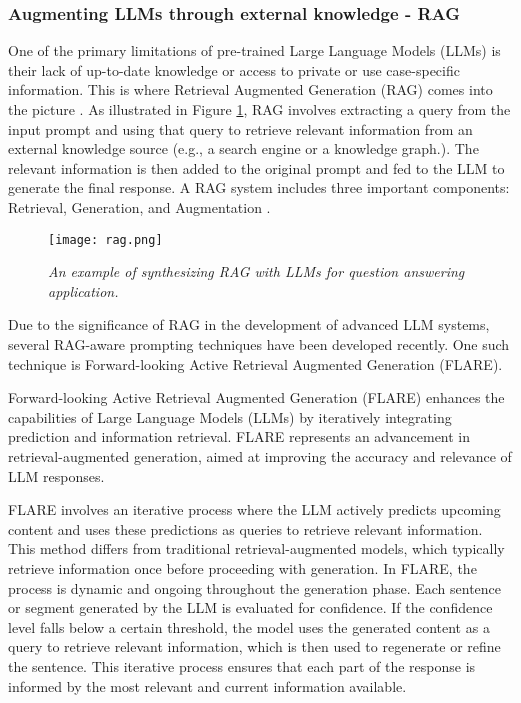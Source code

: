 \subsubsection*{Augmenting LLMs through external knowledge - RAG}

One of the primary limitations of pre-trained Large Language Models (LLMs) is their lack of up-to-date knowledge or access to private or use case-specific information. This is where Retrieval Augmented Generation (RAG) comes into the picture \cite{lewis2021retrievalaugmented}. As illustrated in Figure \ref{fig:rag1}, RAG involves extracting a query from the input prompt and using that query to retrieve relevant information from an external knowledge source (e.g., a search engine or a knowledge graph.). The relevant information is then added to the original prompt and fed to the LLM to generate the final response. A RAG system includes three important components: Retrieval, Generation, and Augmentation \cite{gao2024retrievalaugmented}.

\begin{figure}[H]
    \centering
    \texttt{[image: rag.png]}
    \caption{\it{An example of synthesizing RAG with LLMs for question answering application.}}
    \label{fig:rag1}
\end{figure}

Due to the significance of RAG in the development of advanced LLM systems, several RAG-aware prompting techniques have been developed recently. One such technique is Forward-looking Active Retrieval Augmented Generation (FLARE).

Forward-looking Active Retrieval Augmented Generation (FLARE) \cite{jiang2023active} enhances the capabilities of Large Language Models (LLMs) by iteratively integrating prediction and information retrieval. FLARE represents an advancement in retrieval-augmented generation, aimed at improving the accuracy and relevance of LLM responses.

FLARE involves an iterative process where the LLM actively predicts upcoming content and uses these predictions as queries to retrieve relevant information. This method differs from traditional retrieval-augmented models, which typically retrieve information once before proceeding with generation. In FLARE, the process is dynamic and ongoing throughout the generation phase. Each sentence or segment generated by the LLM is evaluated for confidence. If the confidence level falls below a certain threshold, the model uses the generated content as a query to retrieve relevant information, which is then used to regenerate or refine the sentence. This iterative process ensures that each part of the response is informed by the most relevant and current information available.

